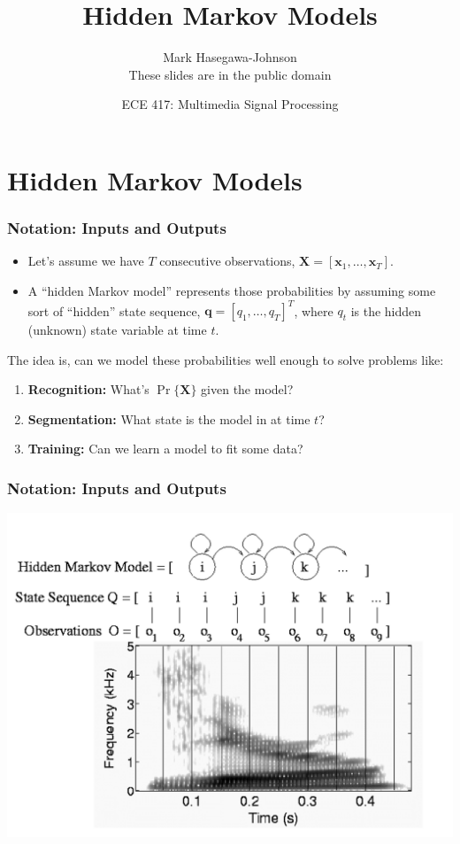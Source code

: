 \documentclass{beamer}
\title{Hidden Markov Models}
\author{Mark Hasegawa-Johnson\\These slides are in the public domain}
\date{ECE 417: Multimedia Signal Processing}
\begin{document}
\begin{frame}
  \maketitle
\end{frame}

\begin{frame}
  \tableofcontents
\end{frame}

\section[HMM]{Hidden Markov Models}
\setcounter{subsection}{1}

\begin{frame}
  \frametitle{Notation: Inputs and Outputs}

  \begin{itemize}
  \item Let's assume we have $T$ consecutive 
    observations, $\mathbf{X}=[\mathbf{x}_1,\ldots,\mathbf{x}_T]$.
  \item A ``hidden Markov model'' represents those probabilities by
    assuming some sort of ``hidden'' state sequence,
    $\mathbf{q}=[q_1,\ldots,q_T]^T$, where $q_t$ is the hidden (unknown) state
    variable at time $t$.
  \end{itemize}
  The idea is, can we model these probabilities well enough to solve
  problems like:
  \begin{enumerate}
  \item {\bf Recognition:} What's $\Pr\{\mathbf{X}\}$ given the  model?
  \item {\bf Segmentation:} What state is the model in at time $t$?
  \item {\bf Training:} Can we learn a model to fit some data?
  \end{enumerate}
\end{frame}

\begin{frame}
  \frametitle{Notation: Inputs and Outputs}

  \centerline{\includegraphics[width=\textwidth]{hmm_aligned_spectrogram_three.png}}
\end{frame}
\end{document}
